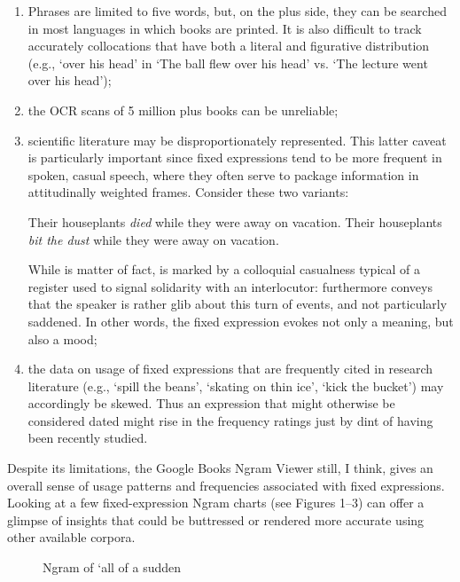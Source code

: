 \documentclass[output=paper]{langsci/langscibook}
\begin{document}
\begin{enumerate}
\item Phrases are limited to five words, but, on the plus side, they can be searched in most languages in which books are printed. It is also difficult to track accurately collocations that have both a literal and figurative distribution (e.g., ‘over his head’ in ‘The ball flew over his head’ vs. ‘The lecture went over his head’); 
\item the OCR scans of 5 million plus books can be unreliable; 
\item scientific literature may be disproportionately represented. This latter caveat is particularly important since fixed expressions tend to be more frequent in spoken, casual speech, where they often serve to package information in attitudinally weighted frames. Consider these two variants: 

\ea \label{ex:6:1} Their houseplants \textit{died} while they were away on vacation.
\ex \label{ex:6:2} Their houseplants \textit{bit the dust} while they were away on vacation.
\z

While  is matter of fact,  is marked by a colloquial casualness typical of a register used to signal solidarity with an interlocutor:  furthermore conveys that the speaker is rather glib about this turn of events, and not particularly saddened. In other words, the fixed expression evokes not only a meaning, but also a mood;

\item the data on usage of fixed expressions that are frequently cited in research literature (e.g., ‘spill the beans’, ‘skating on thin ice’, ‘kick the bucket’) may accordingly be skewed. Thus an expression that might otherwise be considered dated might rise in the frequency ratings just by dint of having been recently studied.
\end{enumerate}

Despite its limitations, the Google Books Ngram Viewer still, I think, gives an overall sense of usage patterns and frequencies associated with fixed expressions. Looking at a few fixed-expression Ngram charts (see Figures 1--3) can offer a glimpse of insights that could be buttressed or rendered more accurate using other available corpora. 

\begin{figure}
    \caption{Ngram of ‘all of a sudden} %
    \label{fig:6:1}
\end{figure}
\end{document}
